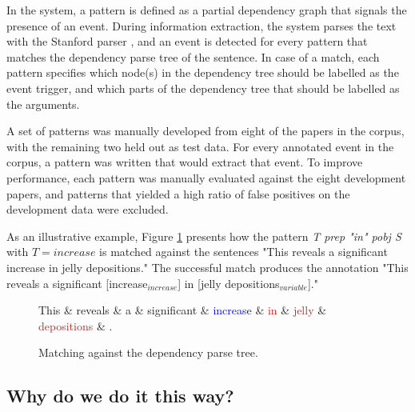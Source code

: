In the system, a pattern is defined as a partial dependency graph that signals the presence of an event. During information extraction, the system parses the text with the Stanford parser \citep{kle03}, and an event is detected for every pattern that matches the dependency parse tree of the sentence. In case of a match, each pattern specifies which node(s) in the dependency tree should be labelled as the event trigger, and which parts of the dependency tree that should be labelled as the arguments. 

A set of patterns was manually developed from eight of the papers in the corpus, with the remaining two held out as test data. For every annotated event in the corpus, a pattern was written that would extract that event. To improve performance, each pattern was manually evaluated against the eight development papers, and patterns that yielded a high ratio of false positives on the development data were excluded.

As an illustrative example, Figure \ref{dep_pattern} presents how the pattern \emph{T prep "in" pobj S} with $T=increase$ is matched against the sentences "This reveals a significant increase in jelly depositions." The successful match produces the annotation "This reveals a significant [increase$_{increase}$] in [jelly depositions$_{variable}$]."

\begin{figure}
\begin{center}
\begin{dependency}[theme = simple]
	\begin{deptext}
	This \& reveals \& a \& significant \& \textcolor{blue}{increase} \& \textcolor{red}{in} \& \textcolor{brown}{jelly} \& \textcolor{brown}{depositions} \& . \\
	\end{deptext}
\end{dependency}
\end{center}
\caption{Matching against the dependency parse tree.}
\label{dep_pattern}
\end{figure}

\subsection{Why do we do it this way?}

